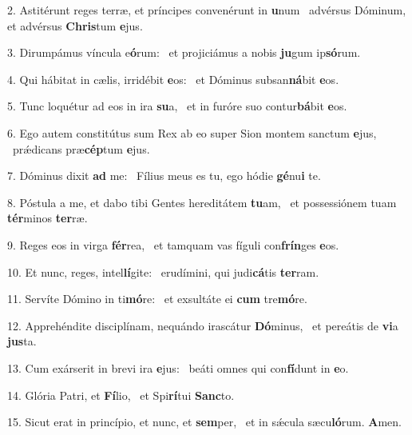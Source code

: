 2. Astitérunt reges terræ, et príncipes convenérunt in \textbf{u}num \ast\  advérsus Dóminum, et advérsus \textbf{Chris}tum \textbf{e}jus.\

3. Dirumpámus víncula e\textbf{ó}rum: \ast\  et projiciámus a nobis \textbf{ju}gum ip\textbf{só}rum.\

4. Qui hábitat in cælis, irridébit \textbf{e}os: \ast\  et Dóminus subsan\textbf{ná}bit \textbf{e}os.\

5. Tunc loquétur ad eos in ira \textbf{su}a, \ast\  et in furóre suo contur\textbf{bá}bit \textbf{e}os.\

6. Ego autem constitútus sum Rex ab eo super Sion montem sanctum \textbf{e}jus, \ast\  prǽdicans præ\textbf{cép}tum \textbf{e}jus.\

7. Dóminus dixit \textbf{ad} me: \ast\  Fílius meus es tu, ego hódie \textbf{gé}nu\textbf{i} te.\

8. Póstula a me, et dabo tibi Gentes hereditátem \textbf{tu}am, \ast\  et possessiónem tuam \textbf{tér}minos \textbf{ter}ræ.\

9. Reges eos in virga \textbf{fér}rea, \ast\  et tamquam vas fíguli con\textbf{frín}ges \textbf{e}os.\

10. Et nunc, reges, intel\textbf{lí}gite: \ast\  erudímini, qui judi\textbf{cá}tis \textbf{ter}ram.\

11. Servíte Dómino in ti\textbf{mó}re: \ast\  et exsultáte ei \textbf{cum} tre\textbf{mó}re.\

12. Apprehéndite disciplínam, nequándo irascátur \textbf{Dó}minus, \ast\  et pereátis de \textbf{vi}a \textbf{jus}ta.\

13. Cum exárserit in brevi ira \textbf{e}jus: \ast\  beáti omnes qui con\textbf{fí}dunt in \textbf{e}o.\

14. Glória Patri, et \textbf{Fí}lio, \ast\  et Spi\textbf{rí}tui \textbf{Sanc}to.\

15. Sicut erat in princípio, et nunc, et \textbf{sem}per, \ast\  et in sǽcula sæcu\textbf{ló}rum. \textbf{A}men.\

